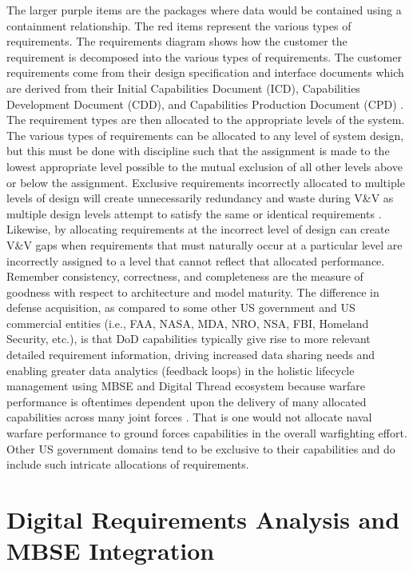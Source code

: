 \documentclass[num-refs]{wiley-article}
\begin{document}
The larger purple items are the packages where data would be contained using a containment relationship. The red items represent the various types of requirements. The requirements diagram shows how the customer the requirement is decomposed into the various types of requirements. The customer requirements come from their design specification and interface documents which are derived from their Initial Capabilities Document (ICD), Capabilities Development Document (CDD), and Capabilities Production Document (CPD) \cite{StarnellPeter1991}. The requirement types are then allocated to the appropriate levels of the system. The various types of requirements can be allocated to any level of system design, but this must be done with discipline such that the assignment is made to the lowest appropriate level possible to the mutual exclusion of all other levels above or below the assignment. Exclusive requirements incorrectly allocated to multiple levels of design will create unnecessarily redundancy and waste during V\&V as multiple design levels attempt to satisfy the same or identical requirements \cite{Manoir2019}. Likewise, by allocating requirements at the incorrect level of design can create V\&V gaps when requirements that must naturally occur at a particular level are incorrectly assigned to a level that cannot reflect that allocated performance. Remember consistency, correctness, and completeness are the measure of goodness with respect to architecture and model maturity. The difference in defense acquisition, as compared to some other US government and US commercial entities (i.e., FAA, NASA, MDA, NRO, NSA, FBI, Homeland Security, etc.), is that DoD capabilities typically give rise to more relevant detailed requirement information, driving increased data sharing needs and enabling greater data analytics (feedback loops) in the holistic lifecycle management using MBSE and Digital Thread ecosystem because warfare performance is oftentimes dependent upon the delivery of many allocated capabilities across many joint forces \cite{TaoZhi2017}. That is one would not allocate naval warfare performance to ground forces capabilities in the overall warfighting effort. Other US government domains tend to be exclusive to their capabilities and do include such intricate allocations of requirements. 

\section{Digital Requirements Analysis and MBSE Integration}
\label{Digital Requirements Analysis and MBSE Integration}
\end{document}
